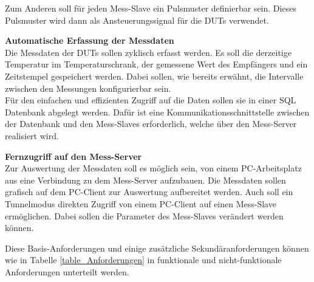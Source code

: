 Zum Anderen soll für jeden Mess-Slave ein Pulsmuster definierbar sein. Dieses Pulsmuster wird dann als Ansteuerungssignal für die \acp{DUT} verwendet.

\textbf{Automatische Erfassung der Messdaten}\\
Die Messdaten der \acp{DUT} sollen zyklisch erfasst werden. Es soll die derzeitige Temperatur im Temperaturschrank, der gemessene Wert des Empfängers und ein Zeitstempel gespeichert werden. Dabei sollen, wie bereits erwähnt, die Intervalle zwischen den Messungen konfigurierbar sein.\\
Für den einfachen und effizienten Zugriff auf die Daten sollen sie in einer \ac{SQL} Datenbank abgelegt werden. Dafür ist eine Kommunikationsschnittstelle zwischen der Datenbank und den Mess-Slaves erforderlich, welche über den Mess-Server realisiert wird.

\textbf{Fernzugriff auf den Mess-Server}\\
Zur Auswertung der Messdaten soll es möglich sein, von einem PC-Arbeitsplatz aus eine Verbindung zu dem Mess-Server aufzubauen. Die Messdaten sollen grafisch auf dem PC-Client zur Auswertung aufbereitet werden.
Auch soll ein Tunnelmodus direkten Zugriff von einem PC-Client auf einen Mess-Slave ermöglichen. Dabei sollen die Parameter des Mess-Slaves verändert werden können.

Diese Basis-Anforderungen und einige zusätzliche Sekundäranforderungen können wie in Tabelle \ref{table_Anforderungen} in funktionale und nicht-funktionale Anforderungen unterteilt werden.


